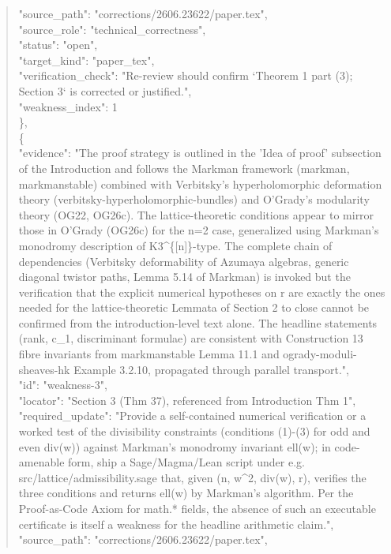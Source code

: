 \documentclass[11pt]{article}
\begin{document}
\begin{quote}
      "source\_path": "corrections/2606.23622/paper.tex",\\
      "source\_role": "technical\_correctness",\\
      "status": "open",\\
      "target\_kind": "paper\_tex",\\
      "verification\_check": "Re-review should confirm `Theorem 1 part (3); Section 3` is corrected or justified.",\\
      "weakness\_index": 1\\
    \},\\
    \{\\
      "evidence": "The proof strategy is outlined in the 'Idea of proof' subsection of the Introduction and follows the Markman framework (markman, markmanstable) combined with Verbitsky's hyperholomorphic deformation theory (verbitsky-hyperholomorphic-bundles) and O'Grady's modularity theory (OG22, OG26c). The lattice-theoretic conditions appear to mirror those in O'Grady (OG26c) for the n=2 case, generalized using Markman's monodromy description of K3\^{}\{[n]\}-type. The complete chain of dependencies (Verbitsky deformability of Azumaya algebras, generic diagonal twistor paths, Lemma 5.14 of Markman) is invoked but the verification that the explicit numerical hypotheses on r are exactly the ones needed for the lattice-theoretic Lemmata of Section 2 to close cannot be confirmed from the introduction-level text alone. The headline statements (rank, c\_1, discriminant formulae) are consistent with Construction 13 fibre invariants from markmanstable Lemma 11.1 and ogrady-moduli-sheaves-hk Example 3.2.10, propagated through parallel transport.",\\
      "id": "weakness-3",\\
      "locator": "Section 3 (Thm 37), referenced from Introduction Thm 1",\\
      "required\_update": "Provide a self-contained numerical verification or a worked test of the divisibility constraints (conditions (1)-(3) for odd and even div(w)) against Markman's monodromy invariant ell(w); in code-amenable form, ship a Sage/Magma/Lean script under e.g. src/lattice/admissibility.sage that, given (n, w\^{}2, div(w), r), verifies the three conditions and returns ell(w) by Markman's algorithm. Per the Proof-as-Code Axiom for math.* fields, the absence of such an executable certificate is itself a weakness for the headline arithmetic claim.",\\
      "source\_path": "corrections/2606.23622/paper.tex",\\

\end{quote}
\end{document}
